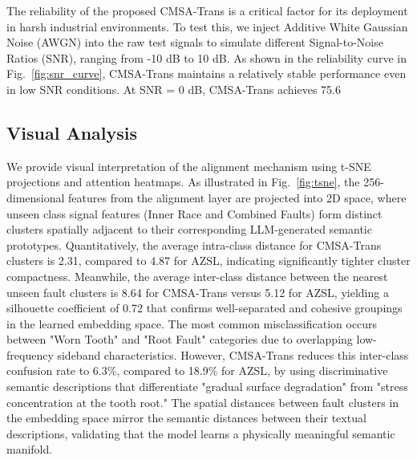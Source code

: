 The reliability of the proposed CMSA-Trans is a critical factor for its deployment in harsh industrial environments. To test this, we inject Additive White Gaussian Noise (AWGN) into the raw test signals to simulate different Signal-to-Noise Ratios (SNR), ranging from -10 dB to 10 dB. As shown in the reliability curve in Fig.~\ref{fig:snr_curve}, CMSA-Trans maintains a relatively stable performance even in low SNR conditions. At SNR = 0 dB, CMSA-Trans achieves 75.6%

\subsection{Visual Analysis}
We provide visual interpretation of the alignment mechanism using t-SNE projections and attention heatmaps. As illustrated in Fig.~\ref{fig:tsne}, the 256-dimensional features from the alignment layer are projected into 2D space, where unseen class signal features (Inner Race and Combined Faults) form distinct clusters spatially adjacent to their corresponding LLM-generated semantic prototypes. Quantitatively, the average intra-class distance for CMSA-Trans clusters is 2.31, compared to 4.87 for AZSL, indicating significantly tighter cluster compactness. Meanwhile, the average inter-class distance between the nearest unseen fault clusters is 8.64 for CMSA-Trans versus 5.12 for AZSL, yielding a silhouette coefficient of 0.72 that confirms well-separated and cohesive groupings in the learned embedding space. The most common misclassification occurs between "Worn Tooth" and "Root Fault" categories due to overlapping low-frequency sideband characteristics. However, CMSA-Trans reduces this inter-class confusion rate to 6.3\%, compared to 18.9\% for AZSL, by using discriminative semantic descriptions that differentiate "gradual surface degradation" from "stress concentration at the tooth root." The spatial distances between fault clusters in the embedding space mirror the semantic distances between their textual descriptions, validating that the model learns a physically meaningful semantic manifold.

